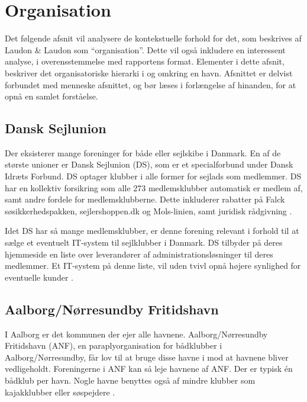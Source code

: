 \section{Organisation}

Det følgende afsnit vil analysere de kontekstuelle forhold for det, som beskrives af Laudon \& Laudon som \enquote{organisation}. Dette vil også inkludere en interessent analyse, i overensstemmelse med rapportens format. Elementer i dette afsnit, beskriver det organisatoriske hierarki i og omkring en havn. Afsnittet er delvist forbundet med menneske afsnittet, og bør læses i forlængelse af hinanden, for at opnå en samlet forståelse.


\subsection{Dansk Sejlunion} %
\label{sub:Dansk_Sejlunion}

Der eksisterer mange foreninger for både eller sejlskibe i Danmark. En af de største unioner er Dansk Sejlunion (DS), som er et specialforbund under Dansk Idræts Forbund. DS optager klubber i alle former for sejlads som medlemmer. DS har en kollektiv forsikring som alle 273 medlemsklubber automatisk er medlem af, samt andre fordele for medlemsklubberne. Dette inkluderer rabatter på Falck søsikkerhedspakken, sejlershoppen.dk og Mols-linien, samt juridisk rådgivning \cite{ds_optagelse,ds_fordele}.

Idet DS har så mange medlemsklubber, er denne forening relevant i forhold til at sælge et eventuelt IT-system til sejlklubber i Danmark. DS tilbyder på deres hjemmeside en liste over leverandører af administrationsløsninger til deres medlemmer. Et IT-system på denne liste, vil uden tvivl opnå højere synlighed for eventuelle kunder \cite{DanskSejlunionKlubAdmin}.


\subsection{Aalborg/Nørresundby Fritidshavn}

I Aalborg er det kommunen der ejer alle havnene. Aalborg/Nørresundby Fritidshavn (ANF), en paraplyorganisation for bådklubber i Aalborg/Nørresundby, får lov til at bruge disse havne i mod at havnene bliver vedligeholdt. Foreningerne i ANF kan så leje havnene af ANF. Der er typisk én bådklub per havn. Nogle havne benyttes også af mindre klubber som kajakklubber eller søspejdere  \cite{int_vb_sl}.

